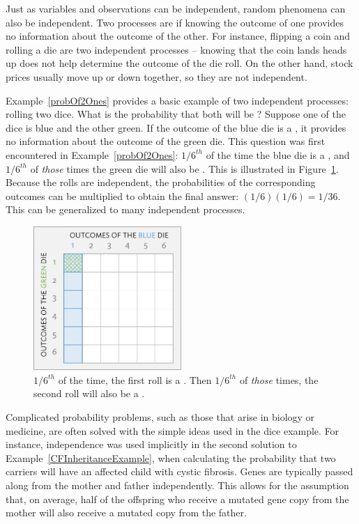 Just as variables and observations can be independent, random phenomena can also be independent. Two processes are  if knowing the outcome of one provides no information about the outcome of the other. For instance, flipping a coin and rolling a die are two independent processes -- knowing that the coin lands heads up does not help determine the outcome of the die roll. On the other hand, stock prices usually move up or down together, so they are not independent. 

Example~\ref{probOf2Ones} provides a basic example of two independent processes: rolling two dice. What is the probability that both will be ? Suppose one of the dice is blue and the other green. If the outcome of the blue die is a , it provides no information about the outcome of the green die. This question was first encountered in Example~\ref{probOf2Ones}: $1/6^{th}$ of the time the blue die is a , and $1/6^{th}$ of \emph{those} times the green die will also be . This is illustrated in Figure~\ref{fig:indepForRollingTwo1s}. Because the rolls are independent, the probabilities of the corresponding outcomes can be multiplied to obtain the final answer: $(1/6)(1/6)=1/36$. This can be generalized to many independent processes. 

\begin{figure}[hht]
\centering
\includegraphics[width=0.5\textwidth]{ch_probability_oi_biostat/figures/indepForRollingTwo1s/indepForRollingTwo1s.png}
\caption{$1/6^{th}$ of the time, the first roll is a . Then $1/6^{th}$ of \emph{those} times, the second roll will also be a .}
\label{fig:indepForRollingTwo1s}
\end{figure}

Complicated probability problems, such as those that arise in biology or medicine, are often solved with the simple ideas used in the dice example. For instance, independence was used implicitly in the second solution to Example~\ref{CFInheritanceExample}, when calculating the probability that two carriers will have an affected child with cystic fibrosis. Genes are typically passed along from the mother and father independently. This allows for the assumption that, on average, half of the offspring who receive a mutated gene copy from the mother will also receive a mutated copy from the father.


